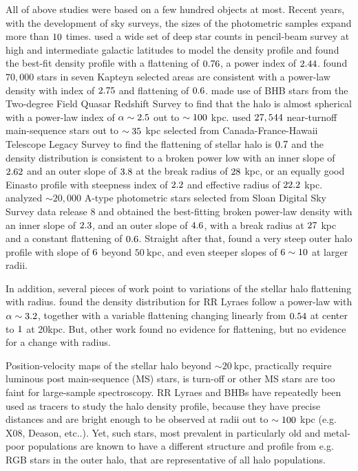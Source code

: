 \documentclass[12pt,preprint]{aastex}
\begin{document}
All of above studies were based on a few hundred objects at most. Recent years, with the development of sky surveys, the sizes of the photometric samples expand more than $\rm 10$ times. \citet{Robin2000} used a wide set of deep star counts in pencil-beam survey at high and intermediate galactic latitudes to model the density profile and found the best-fit density profile with a flattening of $\rm 0.76$, a power index of $\rm 2.44$. \citet{Siegel2002} found $70,000$ stars in seven Kapteyn selected areas are consistent with a power-law density with index of $\rm 2.75$ and flattening of $\rm 0.6$. \citet{Propris2010} made use of BHB stars from the Two-degree Field Quasar Redshift Survey to find that the halo is almost spherical with a power-law index of $\rm \alpha \sim 2.5$ out to $\rm \sim 100~$kpc. \citet{Sesar2011} used $\rm 27,544$ near-turnoff main-sequence stars out to $\rm \sim 35~$kpc selected from Canada-France-Hawaii Telescope Legacy Survey to find the flattening of stellar halo is $\rm 0.7$ and the density distribution is consistent to a broken power low with an inner slope of $\rm 2.62$ and an outer slope of $\rm 3.8$ at the break radius of $\rm 28~$kpc, or an equally good Einasto profile\citep{Einasto1989} with steepness index of $\rm 2.2$ and effective radius of $\rm 22.2~$kpc. \citet{Deason2011} analyzed $\sim 20,000$ A-type photometric stars selected from Sloan Digital Sky Survey data release 8\citep{Ahn2012} and obtained the best-fitting broken power-law density with an inner slope of $\rm 2.3$, and an outer slope of $\rm 4.6$, with a break radius at $\rm 27~$kpc and a constant flattening of $\rm 0.6$. Straight after that, \citet{Deason2014} found a very steep outer halo profile with slope of $\rm 6$ beyond $50~$kpc, and even steeper slopes of $\rm 6\sim10$ at larger radii. 

In addition, several pieces of work point to variations of the stellar halo flattening with radius. \citet{Preston1991} found the density distribution for RR Lyraes follow a power-law with $\rm \alpha \sim 3.2$, together with a variable flattening changing linearly from $\rm 0.54$ at center to $\rm 1$ at 20kpc. But, other work \citep{Sluis1998, Sesar2011,Deason2011} found no evidence for flattening, but no evidence for a change  with radius.

Position-velocity maps of the stellar halo beyond $\sim 20~$kpc, practically require luminous 
post main-sequence (MS) stars, is turn-off or other MS stars are too faint for large-sample spectroscopy.  RR Lyraes and BHBs have repeatedly been used as tracers to study the halo density profile, because they have precise distances and are bright enough to be observed at radii out to $\rm \sim 100~$kpc (e.g. X08, Deason, etc..). Yet, such stars, most prevalent  in particularly old and metal-poor populations\citep{Bell08, Xue2011} are known to have a different structure and profile from e.g. RGB stars in the outer halo, that are representative of all halo populations. 
\end{document}

